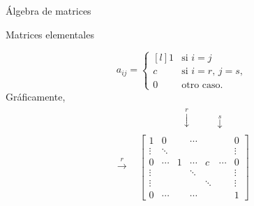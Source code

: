 \begin{chapter}{\'Algebra de matrices}
\begin{section}{Matrices elementales}
\begin{enumerate}
                \begin{equation}\label{elem-tipo-2}
                a_{ij} = \left\{ 
                \begin{matrix*}[l]
                1 &\text{si $i=j$}\\
                c &\text{si $i=r$, $j=s$,} \\
                0 \quad&\text{otro caso.}
                \end{matrix*}\right.
                \end{equation}
                Gráficamente, 
                \begin{align*}
                &\begin{matrix}
                {}^{}&{}^{}&{}^{}&{}^{}&{}^{}&\overset{r}{\downarrow}&{}^{}&{}^{}&{}^{}{}^{}\overset{s}{\downarrow}&{}^{}
                \end{matrix} \\
                \begin{matrix}
                {}^{}\\{}^{}\\
                \overset{r}{\to}\\
                {}^{}\\
                {}^{}\\
                {}^{}
                \end{matrix}
                &\begin{bmatrix}
                1 & 0 &  &\cdots &&& 0  \\
                \vdots  & \ddots  & & &&& \vdots \\
                0 & \cdots &1 &\cdots&c&\cdots &0 \\
                \vdots  &   & &\ddots &&& \vdots \\
                \vdots  &   & & &\ddots&& \vdots \\
                0  & \cdots  & &\cdots &&& 1
                \end{bmatrix}
                \end{align*}
                

\end{enumerate}
\end{section}
\end{chapter}
